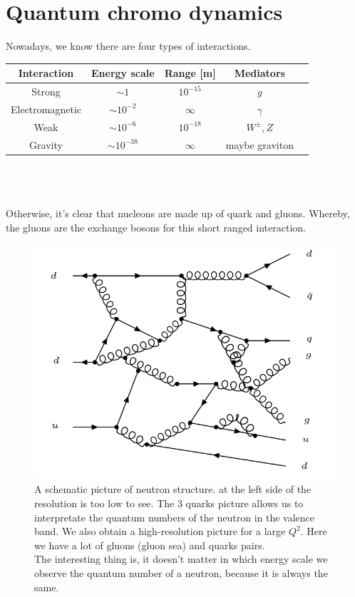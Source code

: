 \section{Quantum chromo dynamics}

Nowadays, we know there are four types of interactions.\\


\begin{tabular}{|c|c|c|c|c|}
\hline 
Interaction & Energy scale & Range [m] & Mediators \\ 
\hline 
Strong & $ \sim 1 $  & $10^{-15} $ & $g$ \\ 
\hline 
Electromagnetic & $ \sim 10^{-2} $ & $\infty$ & $\gamma $ \\ 
\hline  
Weak & $ \sim 10^{-6} $ & $10^{-18}$ & $W^{\pm}, Z$ \\ 
\hline
Gravity & $ \sim 10^{-38} $ & $\infty$ & maybe graviton \\ 
\hline 
\end{tabular}  
\\
\\
\\
Otherwise, it's clear that nucleons are made up of quark and gluons.
Whereby, the gluons are the exchange bosons for this short ranged interaction.
\begin{figure}[h!]
\centering
\includegraphics[scale=0.8]{images/Intro/Neutron.png}
\caption{A schematic picture of neutron structure. at the left side of the resolution is too low to see. The 3 quarks picture allows us to interpretate the quantum numbers of the neutron in the valence band.
We also obtain a high-resolution picture for a large $ Q^2 $. Here we have a lot of gluons (gluon sea) and quarks pairs. \cite{Cunha13} \\ 
The interesting thing is, it doesn't matter in which energy scale we observe the quantum number of a neutron, because it is always the same.}
\end{figure}
